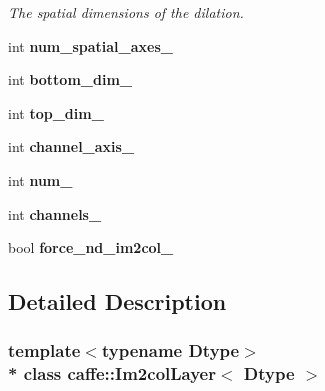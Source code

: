 \begin{DoxyCompactItemize}
\begin{DoxyCompactList}\small\item\em The spatial dimensions of the dilation. \end{DoxyCompactList}\item 
int {\bfseries num\+\_\+spatial\+\_\+axes\+\_\+}\hypertarget{classcaffe_1_1Im2colLayer_a09396822f93f78b400e6e0022cbd0b04}{}\label{classcaffe_1_1Im2colLayer_a09396822f93f78b400e6e0022cbd0b04}

\item 
int {\bfseries bottom\+\_\+dim\+\_\+}\hypertarget{classcaffe_1_1Im2colLayer_a3fc7e611b3a47b656158a4b3bce256e7}{}\label{classcaffe_1_1Im2colLayer_a3fc7e611b3a47b656158a4b3bce256e7}

\item 
int {\bfseries top\+\_\+dim\+\_\+}\hypertarget{classcaffe_1_1Im2colLayer_af0ea2d0f8f54ef280e8d1af46926c35b}{}\label{classcaffe_1_1Im2colLayer_af0ea2d0f8f54ef280e8d1af46926c35b}

\item 
int {\bfseries channel\+\_\+axis\+\_\+}\hypertarget{classcaffe_1_1Im2colLayer_ab7775033a0345f84c2f7a7b936b8973e}{}\label{classcaffe_1_1Im2colLayer_ab7775033a0345f84c2f7a7b936b8973e}

\item 
int {\bfseries num\+\_\+}\hypertarget{classcaffe_1_1Im2colLayer_a0d8977015b84d19c6b1c1a4f2af553c3}{}\label{classcaffe_1_1Im2colLayer_a0d8977015b84d19c6b1c1a4f2af553c3}

\item 
int {\bfseries channels\+\_\+}\hypertarget{classcaffe_1_1Im2colLayer_a819581a35ffba22f5df2c0340210c2e9}{}\label{classcaffe_1_1Im2colLayer_a819581a35ffba22f5df2c0340210c2e9}

\item 
bool {\bfseries force\+\_\+nd\+\_\+im2col\+\_\+}\hypertarget{classcaffe_1_1Im2colLayer_a49819777152d22c57105bdb61df009a3}{}\label{classcaffe_1_1Im2colLayer_a49819777152d22c57105bdb61df009a3}

\end{DoxyCompactItemize}


\subsection{Detailed Description}
\subsubsection*{template$<$typename Dtype$>$\\*
class caffe\+::\+Im2col\+Layer$<$ Dtype $>$}

